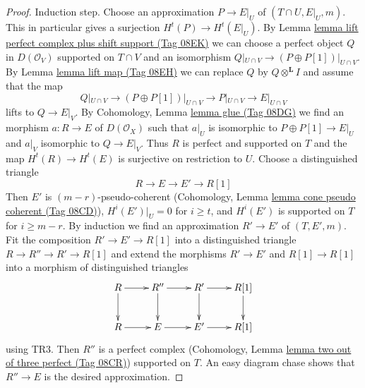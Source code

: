 \documentclass{amsart}
\theoremstyle{plain}
\theoremstyle{definition}
\theoremstyle{remark}
\numberwithin{equation}{subsection}
\begin{document}
\begin{proof}
\medskip\noindent
Induction step. Choose an approximation $P \to E|_U$
of $(T \cap U, E|_U, m)$. This in particular gives a surjection
$H^t(P) \to H^t(E|_U)$. By
Lemma \href{https://stacks.math.columbia.edu/tag/08EK}{lemma lift perfect complex plus shift support (Tag 08EK)}
we can choose a perfect object $Q$ in $D(\mathcal{O}_V)$
supported on $T \cap V$ and an isomorphism
$Q|_{U \cap V} \to (P \oplus P[1])|_{U \cap V}$.
By Lemma \href{https://stacks.math.columbia.edu/tag/08EH}{lemma lift map (Tag 08EH)} we can replace $Q$ by
$Q \otimes^\mathbf{L} I$
and assume that the map
$$
Q|_{U \cap V} \to (P \oplus P[1])|_{U \cap V}
\longrightarrow P|_{U \cap V}
\longrightarrow
E|_{U \cap V}
$$
lifts to $Q \to E|_V$. By
Cohomology, Lemma \href{https://stacks.math.columbia.edu/tag/08DG}{lemma glue (Tag 08DG)}
we find an morphism $a : R \to E$ of $D(\mathcal{O}_X)$
such that $a|_U$ is isomorphic to $P \oplus P[1] \to E|_U$
and $a|_V$ isomorphic to $Q \to E|_V$.
Thus $R$ is perfect and supported on $T$
and the map $H^t(R) \to H^t(E)$ is surjective on restriction to $U$.
Choose a distinguished triangle
$$
R \to E \to E' \to R[1]
$$
Then $E'$ is $(m - r)$-pseudo-coherent
(Cohomology, Lemma \href{https://stacks.math.columbia.edu/tag/08CD}{lemma cone pseudo coherent (Tag 08CD)}),
$H^i(E')|_U = 0$ for $i \geq t$, and
$H^i(E')$ is supported on $T$ for $i \geq m - r$.
By induction we find an approximation $R' \to E'$
of $(T, E', m)$. Fit the composition $R' \to E' \to R[1]$
into a distinguished triangle $R \to R'' \to R' \to R[1]$
and extend the morphisms $R' \to E'$ and $R[1] \to R[1]$ into
a morphism of distinguished triangles
$$
\xymatrix{
R \ar[r] \ar[d] & R'' \ar[d] \ar[r] & R' \ar[d] \ar[r] & R[1] \ar[d] \\
R \ar[r] &  E \ar[r] & E' \ar[r] & R[1]
}
$$
using TR3. Then $R''$ is a perfect complex
(Cohomology, Lemma \href{https://stacks.math.columbia.edu/tag/08CR}{lemma two out of three perfect (Tag 08CR)})
supported on $T$.
An easy diagram chase shows that $R'' \to E$ is the desired
approximation.
\end{proof}
\end{document}
